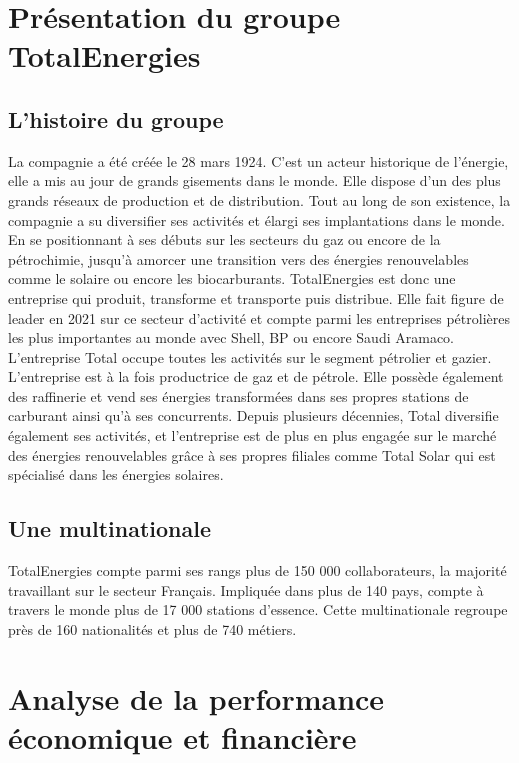 \documentclass[12pt]{article}
\begin{document}
\pagestyle{fancy}
\fancyhead{}
\fancyhead[L]{\leftmark }
\fancyfoot{} 
\fancyfoot[R]{\thepage}


\section{Présentation du groupe TotalEnergies}
\subsection{L'histoire du groupe}
La compagnie a été créée le 28 mars 1924. C'est un acteur historique de l'énergie, elle a mis au jour de grands gisements dans le monde. Elle dispose d'un des plus grands réseaux de
production et de distribution. Tout au long de son existence, la compagnie a su diversifier ses activités et élargi ses implantations dans le monde. En se positionnant à ses débuts sur
les secteurs du gaz ou encore de la pétrochimie, jusqu'à amorcer une transition vers des énergies renouvelables comme le solaire ou encore les biocarburants. TotalEnergies est donc une
entreprise qui produit, transforme et transporte puis distribue. Elle fait figure de leader en 2021 sur ce secteur d'activité et compte parmi les entreprises pétrolières les plus
importantes au monde avec Shell, BP ou encore Saudi Aramaco. L'entreprise Total occupe toutes les activités sur le segment pétrolier et gazier. L'entreprise est à la fois productrice 
de gaz et de pétrole. Elle possède également des raffinerie et vend ses énergies transformées dans ses propres stations de carburant ainsi qu'à ses concurrents. Depuis plusieurs
décennies, Total diversifie également ses activités, et l'entreprise est de plus en plus engagée sur le marché des énergies renouvelables grâce à ses propres filiales comme Total Solar
qui est spécialisé dans les énergies solaires.

\subsection{Une multinationale}
TotalEnergies compte parmi ses rangs plus de 150 000 collaborateurs, la majorité travaillant sur le secteur Français. Impliquée dans plus de 140 pays, compte à travers le
monde plus de 17 000 stations d'essence. Cette multinationale regroupe près de 160 nationalités et plus de 740 métiers. 
\section{Analyse de la performance économique et financière}
\end{document}
